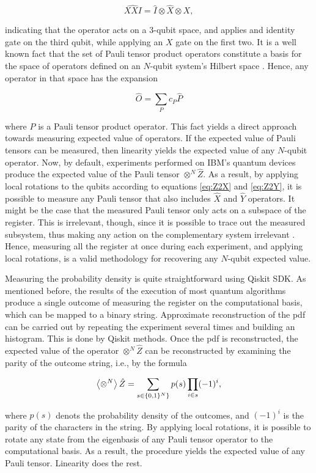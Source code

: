     \begin{equation}
      \hat{XXI} = \hat{I} \otimes \hat{X} \otimes{X},
    \end{equation}

    \noindent indicating that the operator acts on a 3-qubit space, and applies and identity gate on the third qubit, while applying an $X$ gate on the first two. It is a well known fact that the set of Pauli tensor product operators constitute a basis for the space of operators defined on an $N$-qubit system's Hilbert space \cite{Nielsen, Strini}. Hence, any operator in that space has the expansion
    
    \begin{equation}
      \hat{O} = \sum_{P} c_P \hat{P}
    \end{equation}

    \noindent where $P$ is a Pauli tensor product operator. This fact yields a direct approach towards measuring expected value of operators. If the expected value of Pauli tensors can be measured, then linearity yields the expected value of any $N$-qubit operator. Now, by default, experiments performed on IBM's quantum devices produce the expected value of the Pauli tensor $\otimes^{N} \hat{Z}$. As a result, by applying local rotations to the qubits according to equations \ref{eq:Z2X} and \ref{eq:Z2Y}, it is possible to measure any Pauli tensor that also includes $\hat{X}$ and $\hat{Y}$ operators. It might be the case that the measured Pauli tensor only acts on a subspace of the register. This is irrelevant, though, since it is possible to trace out the measured subsystem, thus making any action on the complementary system irrelevant \cite{Nielsen}. Hence, measuring all the register at once during each experiment, and applying local rotations, is a valid methodology for recovering any $N$-qubit expected value.

    Measuring the probability density is quite straightforward using Qiskit SDK. As mentioned before, the results of the execution of most quantum algorithms produce a single outcome of measuring the register on the computational basis, which can be mapped to a binary string. Approximate reconstruction of the pdf can be carried out by repeating the experiment several times and building an histogram. This is done by Qiskit methods. Once the pdf is reconstructed, the expected value of the operator $\otimes^{N} \hat{Z}$ can be reconstructed by examining the parity of the outcome string, i.e., by the formula
    
    \begin{equation}
      \expval{\otimes^{N}} \hat{Z} = \sum_{s \in \{0,1\}^{N}\}} p(s) \prod_{i \in s} (-1)^{i},
      \label{eq:expValPauliZ}
    \end{equation}

    \noindent where $p(s)$ denots the probability density of the outcomes, and $(-1)^{i}$ is the parity of the characters in the string. By applying local rotations, it is possible to rotate any state from the eigenbasis of any Pauli tensor operator to the computational basis. As a result, the procedure yields the expected value of any Pauli tensor. Linearity does the rest.

